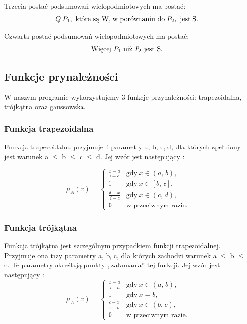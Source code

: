 \documentclass{classrep}
\begin{document}
	Trzecia postać podsumowań wielopodmiotowych ma postać:
	\begin{equation}
	Q \:  P_1, \hbox{ które są W, w porównaniu do } P_2,\hbox{  jest S. }
	\end{equation}
	
	Czwarta postać podsumowań wielopodmiotowych ma postać:
	\begin{equation}
	\hbox{Więcej $P_1$ niż $P_2$ jest S. }
	\end{equation}
	
	\subsection{Funkcje prynależności}
	W naszym programie wykorzystujemy 3 funkcje przynależności: trapezoidalna, trójkątna oraz gaussowska.
	
	\subsubsection{Funkcja trapezoidalna}
	Funkcja trapezoidalna przyjmuje 4 parametry a, b, c, d, dla których spełniony jest warunek a $\leq$ b $\leq$ c $\leq$ d. Jej wzór jest następujący \cite{anbook}: 
	
	\begin{equation}
	\mu_A(x) = \begin{cases}
	\frac{x-a}{b-a} & \mbox{gdy } x \in (a,\, b), \\
	1                 & \mbox{gdy } x \in [b,\, c], \\
	\frac{d-x}{d-c} & \mbox{gdy } x \in (c,\, d), \\
	0                 & \mbox{w przeciwnym razie}.
	\end{cases}
	\end{equation}
	
	
	\subsubsection{Funkcja trójkątna}
	Funkcja trójkątna jest szczególnym przypadkiem funkcji trapezoidalnej. Przyjmuje ona trzy parametry a, b, c, dla których zachodzi warunek a $\leq$ b $\leq$ c. Te parametry określają punkty ,,załamania'' tej funkcji. Jej wzór jest następujący \cite{funkcje}: 
	\begin{equation}
	\mu_A(x) = \begin{cases}
	\frac{x-a}{b-a} & \mbox{gdy } x \in (a,\, b), \\
	1                 & \mbox{gdy } x = b, \\
	\frac{c-x}{c-b} & \mbox{gdy } x \in (b,\, c), \\
	0                 & \mbox{w przeciwnym razie}.
	\end{cases}
	\end{equation}
	
\end{document}
